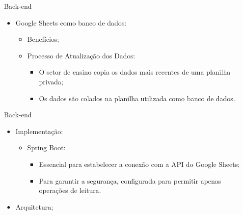 \begin{frame}{Back-end}
    \begin{itemize}
        \item Google Sheets como banco de dados: \vspace{0.5cm}
              \begin{itemize}
                  \item Benefícios; \vspace{0.5cm}
                  \item Processo de Atualização dos Dados: \vspace{0.5cm}
                        \begin{itemize}
                            \item O setor de ensino copia os dados mais recentes de uma planilha privada; \vspace{0.5cm}
                            \item Os dados são colados na planilha utilizada como banco de dados. \vspace{0.5cm}
                        \end{itemize}
              \end{itemize}
    \end{itemize}
\end{frame}

\begin{frame}{Back-end}
    \begin{itemize}
        \item Implementação: \vspace{0.5cm}
              \begin{itemize}
                  \item Spring Boot: \vspace{0.5cm}
                        \begin{itemize}
                            \item Essencial para estabelecer a conexão com a API do Google Sheets; \vspace{0.5cm}
                            \item Para garantir a segurança, configurada para permitir apenas operações de leitura. \vspace{0.5cm}
                        \end{itemize}
              \end{itemize}
        \item Arquitetura; \vspace{0.5cm}
    \end{itemize}
\end{frame}

